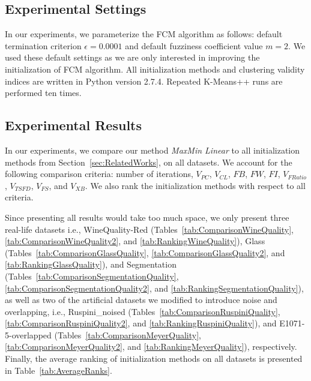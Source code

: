 \documentclass[runningheads,a4paper]{llncs}
\begin{document}
\subsection{Experimental Settings}
\label{subsec:ExperimentalSettings}

In our experiments, we parameterize the FCM algorithm as follows: default termination criterion $\epsilon = 0.0001$ and default fuzziness coefficient value $m = 2$. We used these default settings as we are only interested in improving the initialization of FCM algorithm. All initialization methods and clustering validity indices are written in Python version 2.7.4. Repeated K-Means++ runs are performed ten times. 

\subsection{Experimental Results}
\label{subsec:ExperimentalResults}

In our experiments, we compare our method \textit{MaxMin Linear} to all initialization methods from Section~\ref{sec:RelatedWorks}, on all datasets. We account for the following comparison criteria: number of iterations, $V_{PC}$, $V_{CL}$, $FB$, $FW$, $FI$, $V_{FRatio}$, $V_{TSFD}$, $V_{FS}$, and $V_{XB}$. We also rank the initialization methods with respect to all criteria.

Since presenting all results would take too much space, we only present three real-life datasets  i.e., WineQuality-Red (Tables~\ref{tab:ComparisonWineQuality}, \ref{tab:ComparisonWineQuality2}, and \ref{tab:RankingWineQuality}), Glass (Tables~\ref{tab:ComparisonGlassQuality}, \ref{tab:ComparisonGlassQuality2}, and \ref{tab:RankingGlassQuality}), and Segmentation (Tables~\ref{tab:ComparisonSegmentationQuality}, \ref{tab:ComparisonSegmentationQuality2}, and \ref{tab:RankingSegmentationQuality}), as well as two of the artificial datasets we modified to introduce noise and overlapping, i.e., Ruspini\_noised (Tables~\ref{tab:ComparisonRuspiniQuality}, \ref{tab:ComparisonRuspiniQuality2}, and \ref{tab:RankingRuspiniQuality}), and E1071-5-overlapped (Tables~\ref{tab:ComparisonMeyerQuality}, \ref{tab:ComparisonMeyerQuality2}, and \ref{tab:RankingMeyerQuality}), respectively. Finally, the average ranking of initialization methods on all datasets is presented in Table~\ref{tab:AverageRanks}.
\end{document}
